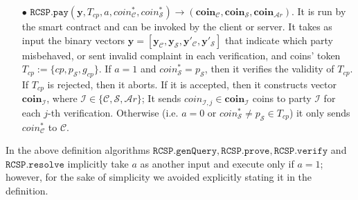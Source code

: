\begin{definition}[RC-S-P Scheme]
\begin{itemize}
\
	
\item[$\bullet$] $\mathtt{RCSP}.\mathtt{pay}(\bm{y},T_{\scriptscriptstyle cp},a,coin^{\scriptscriptstyle *}_{\scriptscriptstyle\mathcal C},coin^{\scriptscriptstyle *}_{\scriptscriptstyle\mathcal S})\rightarrow ({\bm{coin}}_{\scriptscriptstyle\mathcal C},{\bm{coin}}_{\scriptscriptstyle\mathcal S},{\bm{coin}}_{\scriptscriptstyle\mathcal Ar})$. It is run by the smart contract and can be invoked by the client or server. It takes as input the binary vectors $\bm{y}=[\bm{y}_{\scriptscriptstyle \mathcal  C}, \bm{y}_{\scriptscriptstyle \mathcal  S},\bm{y}'_{\scriptscriptstyle \mathcal  C}, \bm{y}'_{\scriptscriptstyle \mathcal  S}]$ that indicate which party misbehaved, or sent invalid complaint  in each verification, and coins' token $T_{\scriptscriptstyle cp}:=\{cp,p_{\scriptscriptstyle\mathcal S},g_{\scriptscriptstyle cp}\}$. If $a=1$ and  $coin^{\scriptscriptstyle *}_{\scriptscriptstyle\mathcal S}= p_{\scriptscriptstyle\mathcal S}$, then it verifies the validity of $T_{\scriptscriptstyle cp}$. If $T_{\scriptscriptstyle cp}$ is rejected, then it aborts. 
If it is accepted, then it constructs  vector ${\bm{coin}}_{\scriptscriptstyle\mathcal I}$, where $\mathcal{I}\in\{\mathcal{C},\mathcal{S},\mathcal{A}r\}$; It sends ${{coin}}_{\scriptscriptstyle\mathcal{I},j}\in{\bm{coin}}_{\scriptscriptstyle\mathcal I}$ coins to party $\mathcal{I}$ for each $j$-th verification. Otherwise (i.e. $a=0$ or $coin^{\scriptscriptstyle *}_{\scriptscriptstyle\mathcal S}\neq p_{\scriptscriptstyle\mathcal S}\in T_{\scriptscriptstyle cp}$)  it only sends $coin^{\scriptscriptstyle *}_{\scriptscriptstyle\mathcal C}$ to $\mathcal C$. 



\end{itemize}
\end{definition}

In the above definition algorithms $\mathtt{RCSP}.\mathtt{genQuery},\mathtt{RCSP}.\mathtt{prove},\mathtt{RCSP}.\mathtt{verify}$ and $\mathtt{RCSP}.\mathtt{resolve}$ implicitly  take $a$ as another input and  execute only if $a=1$; however, for the sake of simplicity we  avoided explicitly stating it  in the definition. 

